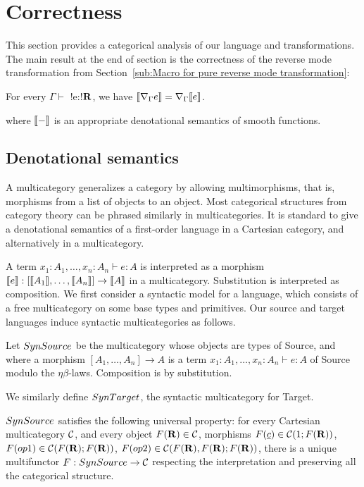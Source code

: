 \section{Correctness}
\label{sec:correctness}

This section provides a categorical analysis of our language and transformations.
The main result at the end of section is the correctness of the reverse mode transformation from Section~\ref{sub:Macro for pure reverse mode transformation}:

 \begin{theorem}
     For every $\Gamma \vdash$ !e:!$\mathbf{R}$, we have 
     $\llbracket \nabla_\Gamma e\rrbracket= \nabla_\Gamma\llbracket e\rrbracket$.
 \end{theorem}
where $\llbracket -\rrbracket$ is an appropriate denotational semantics of smooth functions.

\subsection{Denotational semantics} %
\label{sub:Denotational semantics source and Target}

A multicategory generalizes a category by allowing multimorphisms, that is, morphisms from a list of objects to an object.
Most categorical structures from category theory can be phrased similarly in multicategories.
It is standard to give a denotational semantics of a first-order language in a Cartesian category, and alternatively in a multicategory.

A term $x_1:A_1,\ldots,x_n:A_n\vdash e:A$ is interpreted as a morphism $\llbracket e\rrbracket:[\llbracket A_1\rrbracket,\ldots,\llbracket A_n\rrbracket]\to \llbracket A\rrbracket$ in a multicategory.
Substitution is interpreted as composition. We first consider a syntactic model for a language, which consists of a 
free multicategory on some base types and primitives. Our source and target languages induce syntactic multicategories as follows.

\begin{definition}
    Let $SynSource$ be the multicategory whose objects are types of Source, and where a morphism 
    $[A_1,\ldots,A_n]\to A$ is a term $x_1:A_1,\ldots,x_n:A_n\vdash e:A$ of Source modulo the $\eta\beta$-laws.
    Composition is by substitution.
\end{definition}

We similarly define $SynTarget$, the syntactic multicategory for Target.

$SynSource$ satisfies the following universal property: 
for every Cartesian multicategory $\mathcal{C}$,
and every object $F(\mathbf{R})\in\mathcal{C}$, morphisms $F(\underline{c})\in\mathcal{C}(1;F(\mathbf{R}))$, 
$F(op1)\in\mathcal{C}(F(\mathbf{R});F(\mathbf{R}))$, $F(op2)\in\mathcal{C}(F(\mathbf{R}),F(\mathbf{R});F(\mathbf{R}))$, 
there is a unique multifunctor $F:SynSource\to\mathcal{C}$ respecting the interpretation and preserving all the categorical structure. 

